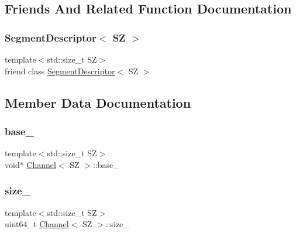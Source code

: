 \subsection{Friends And Related Function Documentation}
\mbox{\label{classChannel_aa9880fe41382d4118e3f013f9058746d}} 
\subsubsection{\texorpdfstring{Segment\+Descriptor$<$ S\+Z $>$}{SegmentDescriptor< SZ >}}
{\footnotesize\ttfamily template$<$std\+::size\+\_\+t SZ$>$ \\
friend class \hyperlink{classSegmentDescriptor}{Segment\+Descriptor}$<$ SZ $>$\hspace{0.3cm}{\ttfamily [friend]}}



\subsection{Member Data Documentation}
\mbox{\label{classChannel_a519cfe913cf0fb5b4c3adfa5df29d40c}} 
\subsubsection{\texorpdfstring{base\+\_\+}{base\_}}
{\footnotesize\ttfamily template$<$std\+::size\+\_\+t SZ$>$ \\
void$\ast$ \hyperlink{classChannel}{Channel}$<$ SZ $>$\+::base\+\_\+\hspace{0.3cm}{\ttfamily [private]}}

\mbox{\label{classChannel_a7593f310eba67835f7df73f5afdf44e6}} 
\subsubsection{\texorpdfstring{size\+\_\+}{size\_}}
{\footnotesize\ttfamily template$<$std\+::size\+\_\+t SZ$>$ \\
uint64\+\_\+t \hyperlink{classChannel}{Channel}$<$ SZ $>$\+::size\+\_\+\hspace{0.3cm}{\ttfamily [private]}}

